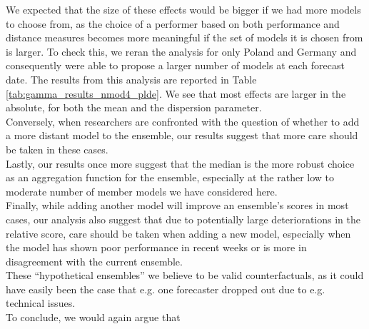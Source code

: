 We expected that the size of these effects would be bigger if we had more models to choose from, as the choice of a performer based on both performance and distance measures becomes more meaningful if the set of models it is chosen from is larger. To check this, we reran the analysis for only Poland and Germany and consequently were able to propose a larger number of models at each forecast date. The results from this analysis are reported in Table \ref{tab:gamma_results_nmod4_plde}. We see that most effects are larger in the absolute, for both the mean and the dispersion parameter. \\

Conversely, when researchers are confronted with the question of whether to add a more distant model to the ensemble, our results suggest that more care should be taken in these cases. \\
Lastly, our results once more suggest that the median is the more robust choice as an aggregation function for the ensemble, especially at the rather low to moderate number of member models we have considered here. \\
Finally, while adding another model will improve an ensemble's scores in most cases, our analysis also suggest that due to potentially large deteriorations in the relative score, care should be taken when adding a new model, especially when the model has shown poor performance in recent weeks or is more in disagreement with the current ensemble.\\
These ``hypothetical ensembles'' we believe to be valid counterfactuals, as it could have easily been the case that e.g. one forecaster dropped out due to e.g. technical issues.\\
To conclude, we would again argue that 
